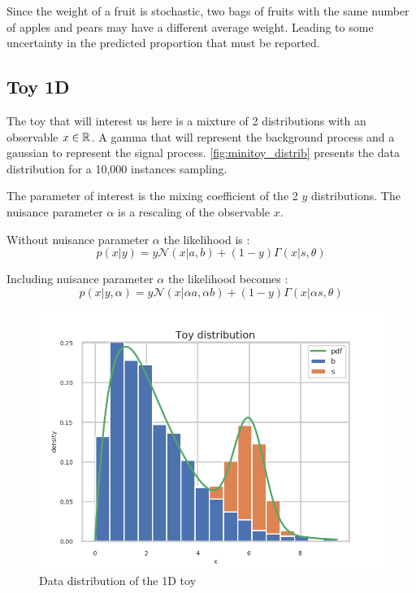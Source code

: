 Since the weight of a fruit is stochastic, two bags of fruits with the same number of apples and pears may have a different average weight.
Leading to some uncertainty in the predicted proportion that must be reported.






\subsection{Toy 1D} %
\label{sub:toy_1d}

The toy that will interest us here is a mixture of 2 distributions with an observable $x \in \mathbb{R}$.
A gamma that will represent the background process and a gaussian to represent the signal process.
\autoref{fig:minitoy_distrib} presents the data distribution for a 10,000 instances sampling.

The parameter of interest is the mixing coefficient of the 2 $y$ distributions.
The nuisance parameter $\alpha$ is a rescaling of the observable $x$.

Without nuisance parameter $\alpha$ the likelihood is :
$$
    p(x | y) = y \mathcal N(x|a, b) + (1-y) \Gamma(x|s, \theta)
$$

Including nuisance parameter $\alpha$ the likelihood becomes :
$$
    p(x | y, \alpha) = y \mathcal N(x|\alpha a, \alpha b) + (1-y) \Gamma(x|\alpha s, \theta)
$$

\begin{figure}[htb]
    \includegraphics[width=\linewidth]{minitoy/distrib.png}
    \caption{Data distribution of the 1D toy}
    \label{fig:minitoy_distrib}
\end{figure}




